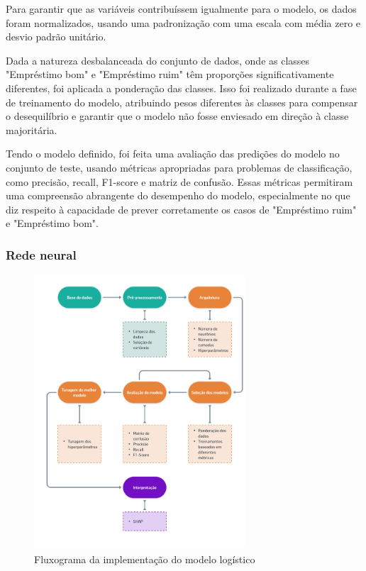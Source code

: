 Para garantir que as variáveis contribuíssem igualmente 
para o modelo, os dados foram normalizados, usando uma padronização com uma escala com média zero e
desvio padrão unitário.

Dada a natureza desbalanceada do conjunto de dados, onde as classes "Empréstimo bom" e "Empréstimo ruim" têm
proporções significativamente diferentes, foi aplicada a ponderação das classes. Isso foi realizado durante 
a fase de treinamento do modelo, atribuindo pesos diferentes às classes para compensar o desequilíbrio e garantir
que o modelo não fosse enviesado em direção à classe majoritária.

Tendo o modelo definido, foi feita uma avaliação das predições do modelo no conjunto de teste, usando métricas
apropriadas para problemas de classificação, como precisão, recall, F1-score e matriz de confusão. 
Essas métricas permitiram uma compreensão abrangente do desempenho do modelo, especialmente no que diz respeito à
capacidade de prever corretamente os casos de "Empréstimo ruim" e "Empréstimo bom".


\subsubsection{Rede neural}

\begin{figure}[H]
  \centering
  \includegraphics[width=0.7\textwidth]{imagens/flugrama_rede_neural.png}
  \caption{Fluxograma da implementação do modelo logístico}
  \label{fig:imagens/flugrama_rede_neural.png}
\end{figure}



